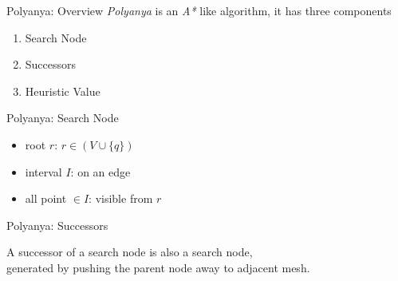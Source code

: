 \begin{frame}{Polyanya: Overview}
\textit{Polyanya} is an \textit{A*} like algorithm, it has three components
\begin{enumerate}
    \item Search Node
    \item Successors
    \item Heuristic Value
\end{enumerate}
\end{frame}

\begin{frame}{Polyanya: Search Node}

\begin{minipage}{.4\textwidth}
\begin{itemize}
    \item \small root $r$: $r \in (V \cup \{q\})$
    \item \small interval $I$: on an edge
    \item \small all point $\in I$: visible from $r$
\end{itemize}
\end{minipage}%
\begin{minipage}{.6\textwidth}
\begin{adjustbox}{max totalsize={.9\textwidth}{.9\textheight}, right}
\end{adjustbox}
\end{minipage}

\end{frame}

\begin{frame}{Polyanya: Successors}
    \begin{minipage}{.4\textwidth}
        A successor of a search node is also a search node,\\generated by pushing the parent node away to adjacent mesh.
    \end{minipage}%
    \begin{minipage}{.6\textwidth}
    \begin{adjustbox}{max totalsize={.9\textwidth}{.9\textheight}, right}
    \end{adjustbox}
    \end{minipage}
\end{frame}

